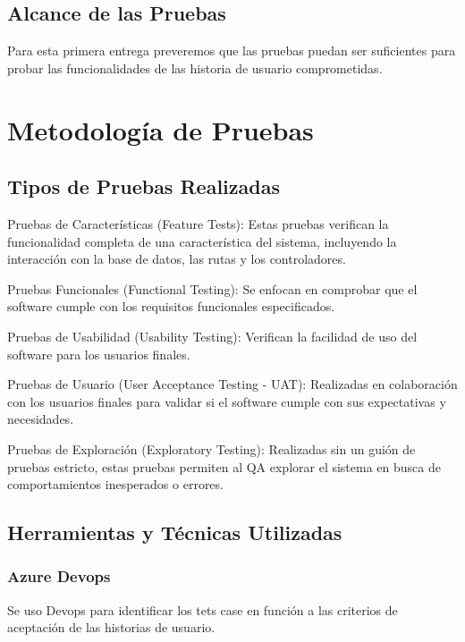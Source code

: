 \documentclass[12pt,letterpaper]{article}
\begin{document}
    \subsection{Alcance de las Pruebas}
    Para esta primera entrega preveremos que las pruebas puedan ser suficientes para probar las funcionalidades de las historia de usuario comprometidas.


\section{Metodología de Pruebas}

    \subsection{Tipos de Pruebas Realizadas}
    Pruebas de Características (Feature Tests):
    Estas pruebas verifican la funcionalidad completa de una característica del sistema, incluyendo la interacción con la base de datos, las rutas y los controladores.
    
    Pruebas Funcionales (Functional Testing): Se enfocan en comprobar que el software cumple con los requisitos funcionales especificados.

    Pruebas de Usabilidad (Usability Testing): Verifican la facilidad de uso del software para los usuarios finales.

    Pruebas de Usuario (User Acceptance Testing - UAT): Realizadas en colaboración con los usuarios finales para validar si el software cumple con sus expectativas y necesidades.

    Pruebas de Exploración (Exploratory Testing): Realizadas sin un guión de pruebas estricto, estas pruebas permiten al QA explorar el sistema en busca de comportamientos inesperados o errores.
    
    \subsection{ Herramientas y Técnicas Utilizadas}
    \subsubsection{Azure Devops}
    Se uso Devops para identificar los tets case en función a las criterios de aceptación de las historias de usuario.
\end{document}
